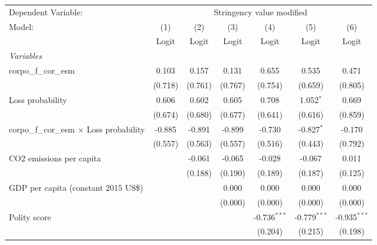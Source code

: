 
\begingroup
\centering
\begin{tabular}{lcccccc}
   \toprule
   Dependent Variable: & \multicolumn{6}{c}{Stringency value modified}\\
   Model:                                           & (1)     & (2)     & (3)     & (4)            & (5)            & (6)\\  
                                                    &  Logit  & Logit   & Logit   & Logit          & Logit          & Logit\\  
   \midrule
   \emph{Variables}\\
   corpo\_f\_cor\_esm                               & 0.103   & 0.157   & 0.131   & 0.655          & 0.535          & 0.471\\   
                                                    & (0.718) & (0.761) & (0.767) & (0.754)        & (0.659)        & (0.805)\\   
   Loss probability                                 & 0.606   & 0.602   & 0.605   & 0.708          & 1.052$^{*}$    & 0.669\\   
                                                    & (0.674) & (0.680) & (0.677) & (0.641)        & (0.616)        & (0.859)\\   
   corpo\_f\_cor\_esm $\times$ Loss probability     & -0.885  & -0.891  & -0.899  & -0.730         & -0.827$^{*}$   & -0.170\\   
                                                    & (0.557) & (0.563) & (0.557) & (0.516)        & (0.443)        & (0.792)\\   
   CO2 emissions per capita                         &         & -0.061  & -0.065  & -0.028         & -0.067         & 0.011\\   
                                                    &         & (0.188) & (0.190) & (0.189)        & (0.187)        & (0.125)\\   
   GDP per capita (constant 2015 US\$)              &         &         & 0.000   & 0.000          & 0.000          & 0.000\\   
                                                    &         &         & (0.000) & (0.000)        & (0.000)        & (0.000)\\   
   Polity score                                     &         &         &         & -0.736$^{***}$ & -0.779$^{***}$ & -0.935$^{***}$\\   
                                                    &         &         &         & (0.204)        & (0.215)        & (0.198)\\   

\end{tabular}
